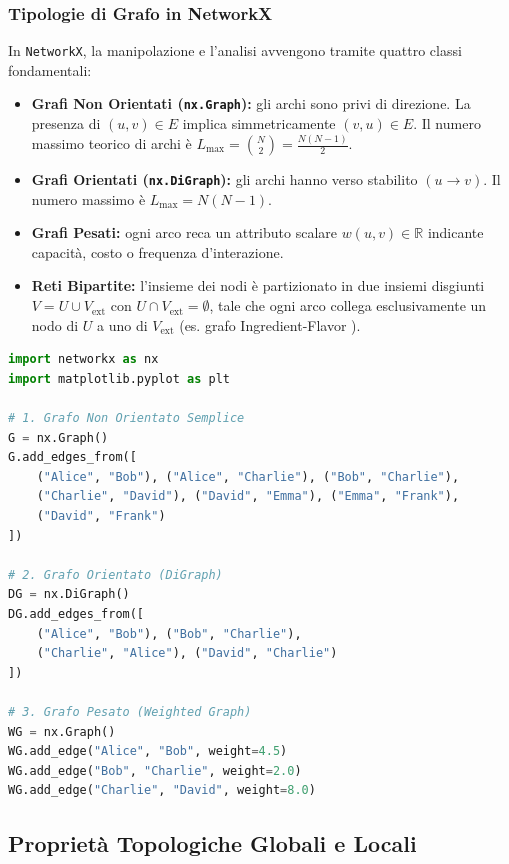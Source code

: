 \FloatBarrier
\subsubsection{Tipologie di Grafo in NetworkX}
In \texttt{NetworkX}, la manipolazione e l'analisi avvengono tramite quattro classi fondamentali:
\begin{itemize}
    \item \textbf{Grafi Non Orientati (\texttt{nx.Graph}):} gli archi sono privi di direzione. La presenza di $(u, v) \in E$ implica simmetricamente $(v, u) \in E$. Il numero massimo teorico di archi è $L_{\max} = \binom{N}{2} = \frac{N(N-1)}{2}$.
    \item \textbf{Grafi Orientati (\texttt{nx.DiGraph}):} gli archi hanno verso stabilito $(u \to v)$. Il numero massimo è $L_{\max} = N(N-1)$.
    \item \textbf{Grafi Pesati:} ogni arco reca un attributo scalare $w(u, v) \in \mathbb{R}$ indicante capacità, costo o frequenza d'interazione.
    \item \textbf{Reti Bipartite:} l'insieme dei nodi è partizionato in due insiemi disgiunti $V = U \cup V_{\text{ext}}$ con $U \cap V_{\text{ext}} = \emptyset$, tale che ogni arco collega esclusivamente un nodo di $U$ a uno di $V_{\text{ext}}$ (es. grafo Ingredient-Flavor \cite{barabasi2016}).
\end{itemize}

\begin{lstlisting}[language=Python, caption={Inizializzazione e popolamento di grafi non orientati, orientati e pesati.}]
import networkx as nx
import matplotlib.pyplot as plt

# 1. Grafo Non Orientato Semplice
G = nx.Graph()
G.add_edges_from([
    ("Alice", "Bob"), ("Alice", "Charlie"), ("Bob", "Charlie"),
    ("Charlie", "David"), ("David", "Emma"), ("Emma", "Frank"),
    ("David", "Frank")
])

# 2. Grafo Orientato (DiGraph)
DG = nx.DiGraph()
DG.add_edges_from([
    ("Alice", "Bob"), ("Bob", "Charlie"),
    ("Charlie", "Alice"), ("David", "Charlie")
])

# 3. Grafo Pesato (Weighted Graph)
WG = nx.Graph()
WG.add_edge("Alice", "Bob", weight=4.5)
WG.add_edge("Bob", "Charlie", weight=2.0)
WG.add_edge("Charlie", "David", weight=8.0)
\end{lstlisting}

\FloatBarrier
\subsection{Proprietà Topologiche Globali e Locali}
\label{subsec:lab-topological-measures}

